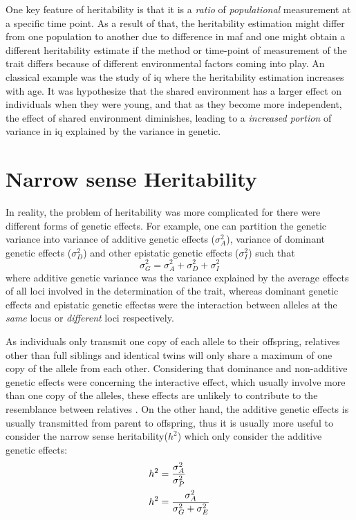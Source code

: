 \documentclass{book}
\begin{document}
	One key feature of heritability is that it is a \emph{ratio} of \emph{populational} measurement at a specific time point.
	As a result of that, the heritability estimation might differ from one population to another due to difference in \gls{maf} and one might obtain a different heritability estimate if the method or time-point of measurement of the trait differs because of different environmental factors coming into play.
	An classical example was the study of \gls{iq} where the heritability estimation increases with age\citep{Bouchard2013}.
	It was hypothesize that the shared environment has a larger effect on individuals when they were young, and that as they become more independent, the effect of shared environment diminishes, leading to a \emph{increased portion} of variance in \gls{iq} explained by the variance in genetic\citep{Bouchard2013}. 
	
	\section{Narrow sense Heritability}
	In reality, the problem of heritability was more complicated for there were different forms of genetic effects. 
	For example, one can partition the genetic variance into variance of additive genetic effects ($\sigma_A^2$), variance of dominant genetic effects ($\sigma_D^2$) and other epistatic genetic effects ($\sigma_I^2$) such that
	$$
		\sigma_G^2=\sigma_A^2+\sigma_D^2+\sigma_I^2
	$$
	where additive genetic variance was the variance explained by the average effects of all loci involved in the determination of the trait, whereas dominant genetic effects and epistatic genetic effectss were the interaction between alleles at the \emph{same} locus or \emph{different} loci respectively.
	
	As individuals only transmit one copy of each allele to their offspring, relatives other than full siblings and identical twins will only share a maximum of one copy of the allele from each other.
	Considering that dominance and non-additive genetic effects were concerning the interactive effect, which usually involve more than one copy of the alleles, these effects are unlikely to contribute to the resemblance between relatives \citep{Visscher2008}.
	On the other hand, the additive genetic effects is usually transmitted from parent to offspring, thus it is usually more useful to consider the narrow sense heritability($h^2$) which only consider the additive genetic effects:
	\begin{align}
	h^2&=\frac{\sigma_A^2}{\sigma_P^2} \notag\\
	h^2&=\frac{\sigma_A^2}{\sigma_G^2+\sigma_E^2}
	\label{eq:narrowHeritability}
	\end{align}
	
\end{document}
